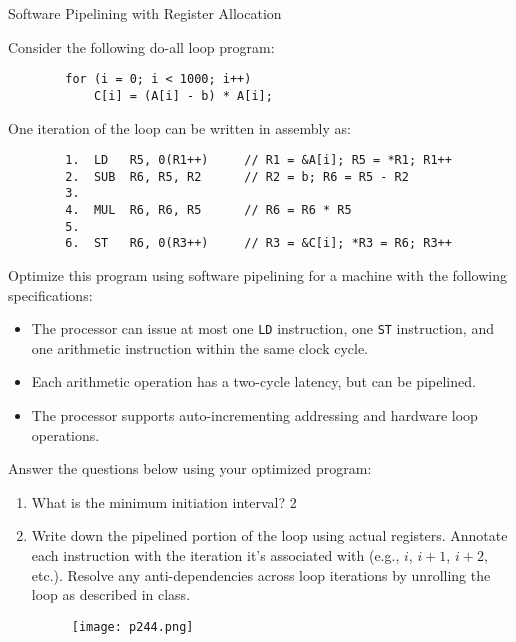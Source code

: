 	\begin{problem} Software Pipelining with Register Allocation

		\item Consider the following do-all loop program:
		\begin{verbatim}
		for (i = 0; i < 1000; i++)
			C[i] = (A[i] - b) * A[i];
		\end{verbatim}
		One iteration of the loop can be written in assembly as:
		\begin{verbatim}
		1.  LD   R5, 0(R1++)     // R1 = &A[i]; R5 = *R1; R1++
		2.  SUB  R6, R5, R2      // R2 = b; R6 = R5 - R2
		3.
		4.  MUL  R6, R6, R5      // R6 = R6 * R5
		5.
		6.  ST   R6, 0(R3++)     // R3 = &C[i]; *R3 = R6; R3++
		\end{verbatim}
		Optimize this program using software pipelining for a machine with the following specifications:
		\begin{itemize}[noitemsep]
			\item The processor can issue at most one \texttt{LD} instruction, one \texttt{ST} instruction, and one arithmetic instruction within the same clock cycle.
			\item Each arithmetic operation has a two-cycle latency, but can be pipelined.
			\item The processor supports auto-incrementing addressing and hardware loop operations.
		\end{itemize}
		
		\item Answer the questions below using your optimized program:
		\begin{enumerate}
			\item What is the minimum initiation interval?
			{\color{red} 2}
			\item Write down the pipelined portion of the loop using actual registers. Annotate each instruction with the iteration it's associated with (e.g., $i$, $i+1$, $i+2$, etc.). Resolve any anti-dependencies across loop iterations by unrolling the loop as described in class.
			
\begin{figure}[H]
    \centering
    \texttt{[image: p244.png]}
    \caption{}
    \label{fig:p244}
\end{figure}
		

\end{enumerate}
\end{problem}
